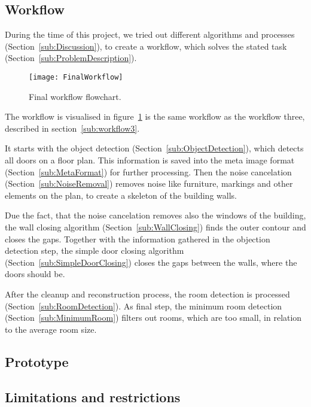 \subsection{Workflow}
During the time of this project, we tried out different algorithms and processes (Section~\ref{sub:Discussion}), to create a workflow, which solves the stated task (Section~\ref{sub:ProblemDescription}).

\begin{figure}[H]
	\centering
	\texttt{[image: FinalWorkflow]}
	\caption{Final workflow flowchart.}
	\label{fig:FinalWorkflow}
\end{figure}

The workflow is visualised in figure~\ref{fig:FinalWorkflow} is the same workflow as the workflow three, described in section~\ref{sub:workflow3}.

It starts with the object detection (Section~\ref{sub:ObjectDetection}), which detects all doors on a floor plan. This information is saved into the meta image format (Section~\ref{sub:MetaFormat}) for further processing. Then the noise cancelation (Section~\ref{sub:NoiseRemoval}) removes noise like furniture, markings and other elements on the plan, to create a skeleton of the building walls.

Due the fact, that the noise cancelation removes also the windows of the building, the wall closing algorithm (Section~\ref{sub:WallClosing}) finds the outer contour and closes the gaps. Together with the information gathered in the objection detection step, the simple door closing algorithm (Section~\ref{sub:SimpleDoorClosing}) closes the gaps between the walls, where the doors should be.

After the cleanup and reconstruction process, the room detection is processed (Section~\ref{sub:RoomDetection}). As final step, the minimum room detection (Section~\ref{sub:MinimumRoom}) filters out rooms, which are too small, in relation to the average room size.


\subsection{Prototype}

\subsection{Limitations and restrictions}